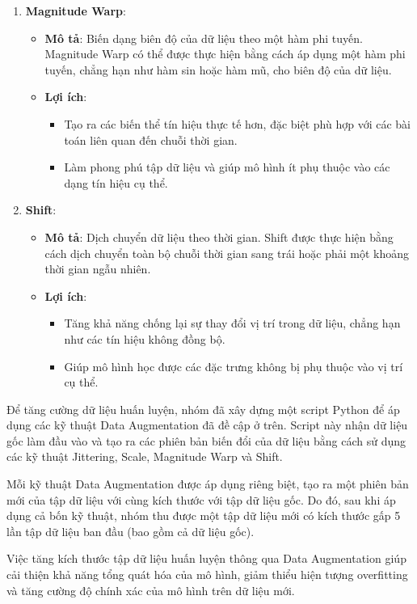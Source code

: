 \begin{enumerate}
\item \textbf{Magnitude Warp}: 
\begin{itemize}
\item \textbf{Mô tả}: Biến dạng biên độ của dữ liệu theo một hàm phi tuyến. Magnitude Warp có thể được thực hiện bằng cách áp dụng một hàm phi tuyến, chẳng hạn như hàm sin hoặc hàm mũ, cho biên độ của dữ liệu.
\item \textbf{Lợi ích}:
\begin{itemize}
\item Tạo ra các biến thể tín hiệu thực tế hơn, đặc biệt phù hợp với các bài toán liên quan đến chuỗi thời gian.
\item Làm phong phú tập dữ liệu và giúp mô hình ít phụ thuộc vào các dạng tín hiệu cụ thể.
 \end{itemize}
\end{itemize}

\item \textbf{Shift}: 
 \begin{itemize}
 \item \textbf{Mô tả}: Dịch chuyển dữ liệu theo thời gian. Shift được thực hiện bằng cách dịch chuyển toàn bộ chuỗi thời gian sang trái hoặc phải một khoảng thời gian ngẫu nhiên.
 \item \textbf{Lợi ích}:
\begin{itemize}
\item Tăng khả năng chống lại sự thay đổi vị trí trong dữ liệu, chẳng hạn như các tín hiệu không đồng bộ.
\item Giúp mô hình học được các đặc trưng không bị phụ thuộc vào vị trí cụ thể.
\end{itemize}
\end{itemize}

\end{enumerate}

Để tăng cường dữ liệu huấn luyện, nhóm đã xây dựng một script Python để áp dụng các kỹ thuật Data Augmentation đã đề cập ở trên. Script này nhận dữ liệu gốc làm đầu vào và tạo ra các phiên bản biến đổi của dữ liệu bằng cách sử dụng các kỹ thuật Jittering, Scale, Magnitude Warp và Shift.

Mỗi kỹ thuật Data Augmentation được áp dụng riêng biệt, tạo ra một phiên bản mới của tập dữ liệu với cùng kích thước với tập dữ liệu gốc. Do đó, sau khi áp dụng cả bốn kỹ thuật, nhóm thu được một tập dữ liệu mới có kích thước gấp 5 lần tập dữ liệu ban đầu (bao gồm cả dữ liệu gốc). 

Việc tăng kích thước tập dữ liệu huấn luyện thông qua Data Augmentation giúp cải thiện khả năng tổng quát hóa của mô hình, giảm thiểu hiện tượng overfitting và tăng cường độ chính xác của mô hình trên dữ liệu mới.

